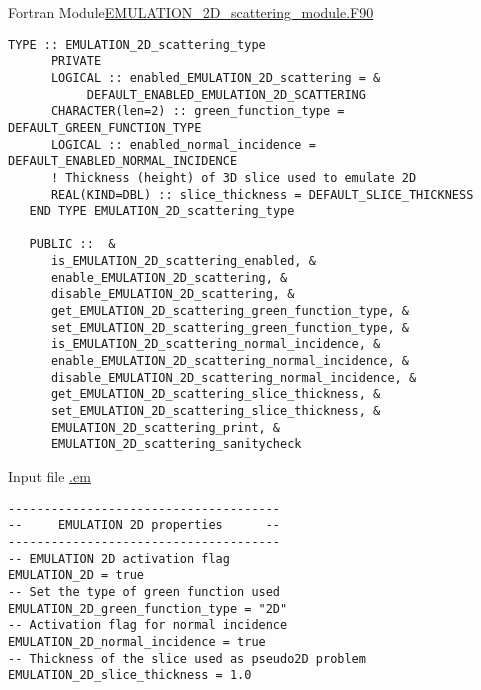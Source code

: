 %
%
% 

  \begin{frame}{Fortran Module}{\url{EMULATION_2D_scattering_module.F90}}

    \begin{lstlisting}[style=myFORTRANcodeS]
   TYPE :: EMULATION_2D_scattering_type
      PRIVATE 
      LOGICAL :: enabled_EMULATION_2D_scattering = &
           DEFAULT_ENABLED_EMULATION_2D_SCATTERING
      CHARACTER(len=2) :: green_function_type = DEFAULT_GREEN_FUNCTION_TYPE
      LOGICAL :: enabled_normal_incidence = DEFAULT_ENABLED_NORMAL_INCIDENCE
      ! Thickness (height) of 3D slice used to emulate 2D
      REAL(KIND=DBL) :: slice_thickness = DEFAULT_SLICE_THICKNESS 
   END TYPE EMULATION_2D_scattering_type

   PUBLIC ::  &
      is_EMULATION_2D_scattering_enabled, &
      enable_EMULATION_2D_scattering, &
      disable_EMULATION_2D_scattering, &
      get_EMULATION_2D_scattering_green_function_type, &
      set_EMULATION_2D_scattering_green_function_type, &
      is_EMULATION_2D_scattering_normal_incidence, &
      enable_EMULATION_2D_scattering_normal_incidence, &
      disable_EMULATION_2D_scattering_normal_incidence, &
      get_EMULATION_2D_scattering_slice_thickness, &
      set_EMULATION_2D_scattering_slice_thickness, &
      EMULATION_2D_scattering_print, &
      EMULATION_2D_scattering_sanitycheck         
    \end{lstlisting}


   \framebreak %

   
   \begin{block}{Input file \url{.em}} 
     \begin{lstlisting}[basicstyle=\ttfamily\footnotesize,tabsize=3,frame=none]
--------------------------------------
--     EMULATION 2D properties      --
--------------------------------------
-- EMULATION 2D activation flag
EMULATION_2D = true
-- Set the type of green function used
EMULATION_2D_green_function_type = "2D"
-- Activation flag for normal incidence
EMULATION_2D_normal_incidence = true
-- Thickness of the slice used as pseudo2D problem
EMULATION_2D_slice_thickness = 1.0
     \end{lstlisting}
   \end{block}


\end{frame}
